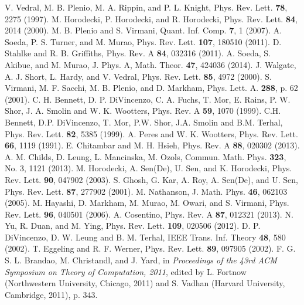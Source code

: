 \documentclass[aps,prx,twocolumn,showpacs,amsmath,notitlepage,amssymb,superscriptaddress]{revtex4-1}
\begin{document}
\begin{thebibliography}{99}
 V. Vedral, M. B. Plenio, M. A. Rippin, and P. L. Knight, Phys. Rev. Lett. {\bf 78}, 2275 (1997).
 M. Horodecki, P. Horodecki, and R. Horodecki, Phys. Rev. Lett. {\bf 84}, 2014 (2000).
 M. B. Plenio and S. Virmani, Quant. Inf. Comp. {\bf 7}, 1 (2007).
 A. Soeda, P. S. Turner, and M. Murao, Phys. Rev. Lett. {\bf 107}, 180510 (2011).
 D. Stahlke and R. B. Griffiths, Phys. Rev. A {\bf 84}, 032316 (2011).
 A. Soeda, S. Akibue, and M. Murao, J. Phys. A, Math. Theor. {\bf 47}, 424036 (2014).
 J. Walgate, A. J. Short, L. Hardy, and V. Vedral, Phys. Rev. Lett. {\bf 85}, 4972 (2000).
 S. Virmani, M. F. Sacchi, M. B. Plenio, and D. Markham, Phys. Lett. A. {\bf 288}, p. 62 (2001).
 C. H. Bennett, D. P. DiVincenzo, C. A. Fuchs, T. Mor, E. Rains, P. W. Shor, J. A. Smolin and W. K. Wootters, Phys. Rev. A {\bf 59}, 1070 (1999).
 C.H. Bennett, D.P. DiVincenzo, T. Mor, P.W. Shor, J.A. Smolin and B.M. Terhal, Phys. Rev. Lett. {\bf 82}, 5385 (1999).
 A. Peres and W. K. Wootters, Phys. Rev. Lett. {\bf 66}, 1119 (1991).
 E. Chitambar and M. H. Hsieh, Phys. Rev. A {\bf 88}, 020302 (2013).
 A. M. Childs, D. Leung, L. Mancinska, M. Ozols, Commun. Math. Phys. {\bf 323}, No. 3, 1121 (2013).
 M. Horodecki, A. Sen(De), U. Sen, and K. Horodecki, Phys. Rev. Lett. {\bf 90}, 047902 (2003).
 S. Ghosh, G. Kar, A. Roy, A. Sen(De), and U. Sen, Phys. Rev. Lett. {\bf 87}, 277902 (2001).
 M. Nathanson, J. Math. Phys. {\bf 46}, 062103 (2005).
 M. Hayashi, D. Markham, M. Murao, M. Owari, and S. Virmani, Phys. Rev. Lett. {\bf 96}, 040501 (2006).
 A. Cosentino, Phys. Rev. A {\bf 87}, 012321 (2013).
 N. Yu, R. Duan, and M. Ying, Phys. Rev. Lett. {\bf 109}, 020506 (2012).
 D. P. DiVincenzo, D. W. Leung and B. M. Terhal, IEEE Trans. Inf. Theory {\bf 48}, 580 (2002).
 T. Eggeling and R. F. Werner, Phys. Rev. Lett. {\bf 89}, 097905 (2002).
 F. G. S. L. Brandao, M. Christandl, and J. Yard, in {\it Proceedings of the 43rd ACM Symposium on Theory of Computation, 2011}, edited by L. Fortnow (Northwestern University, Chicago, 2011) and S. Vadhan (Harvard University, Cambridge, 2011), p. 343.

\end{thebibliography}
\end{document}

